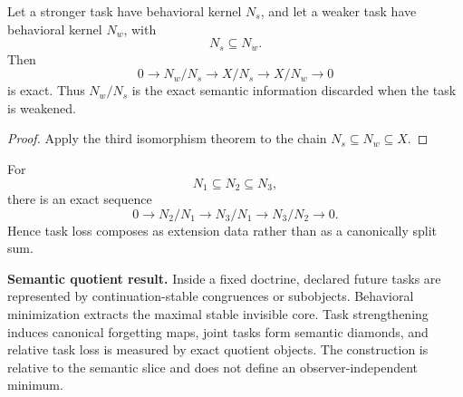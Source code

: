 \begin{theorem}
\label{thm:block17-task-change}
Let a stronger task have behavioral kernel \(N_s\), and let a weaker task have behavioral kernel \(N_w\), with
\[
 N_s\subseteq N_w.
\]
Then
\[
 0\longrightarrow N_w/N_s
 \longrightarrow X/N_s
 \longrightarrow X/N_w
 \longrightarrow0
\]
is exact.  Thus \(N_w/N_s\) is the exact semantic information discarded when the task is weakened.
\end{theorem}

\begin{proof}
Apply the third isomorphism theorem to the chain \(N_s\subseteq N_w\subseteq X\).
\end{proof}

\begin{corollary}
\label{cor:block17-task-loss-composition}
For
\[
 N_1\subseteq N_2\subseteq N_3,
\]
there is an exact sequence
\[
 0\longrightarrow N_2/N_1
 \longrightarrow N_3/N_1
 \longrightarrow N_3/N_2
 \longrightarrow0.
\]
Hence task loss composes as extension data rather than as a canonically split sum.
\end{corollary}

\begin{resultbox}
\textbf{Semantic quotient result.}
Inside a fixed doctrine, declared future tasks are represented by continuation-stable congruences or subobjects.  Behavioral minimization extracts the maximal stable invisible core.  Task strengthening induces canonical forgetting maps, joint tasks form semantic diamonds, and relative task loss is measured by exact quotient objects.  The construction is relative to the semantic slice and does not define an observer-independent minimum.
\end{resultbox}
